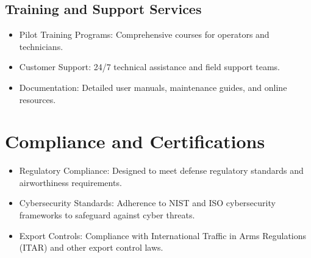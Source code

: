 \documentclass{article}
\begin{document}
\subsection{Training and Support Services}
\begin{itemize}
    \item Pilot Training Programs: Comprehensive courses for operators and technicians.
    \item Customer Support: 24/7 technical assistance and ﬁeld support teams.
    \item Documentation: Detailed user manuals, maintenance guides, and online resources.
\end{itemize}

\section{Compliance and Certifications}
\begin{itemize}
    \item Regulatory Compliance: Designed to meet defense regulatory standards and airworthiness requirements.
    \item Cybersecurity Standards: Adherence to NIST and ISO cybersecurity frameworks to safeguard against cyber threats.
    \item Export Controls: Compliance with International Traﬃc in Arms Regulations (ITAR) and other export control laws.
\end{itemize}
\end{document}
